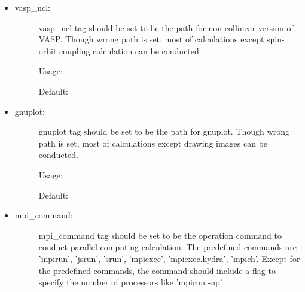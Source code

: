 \documentclass[letterpaper,10pt,english]{sphinxmanual}
\begin{document}
\begin{itemize}
\item {} \begin{description}
\item[{vasp\_ncl:}] \leavevmode
vasp\_ncl tag should be set to be the path for non-collinear version of VASP.
Though wrong path is set, most of calculations except spin-orbit coupling calculation can be conducted.

Usage:

\begin{sphinxVerbatim}[commandchars=\\\{\}]
   \PYG{p}{[}\PYG{p}{]}
\end{sphinxVerbatim}

Default:

\begin{sphinxVerbatim}[commandchars=\\\{\}]
   
\end{sphinxVerbatim}

\end{description}

\item {} \begin{description}
\item[{gnuplot:}] \leavevmode
gnuplot tag should be set to be the path for gnuplot.
Though wrong path is set, most of calculations except drawing images can be conducted.

Usage:

\begin{sphinxVerbatim}[commandchars=\\\{\}]
   \PYG{p}{[}\PYG{p}{]}
\end{sphinxVerbatim}

Default:

\begin{sphinxVerbatim}[commandchars=\\\{\}]
   
\end{sphinxVerbatim}

\end{description}

\item {} \begin{description}
\item[{mpi\_command:}] \leavevmode
mpi\_command tag should be set to be the operation command to conduct parallel computing calculation.
The predefined commands are ’mpirun’, ’jsrun’, ’srun’, ’mpiexec’, ’mpiexec.hydra’, ’mpich’.
Except for the predefined commands, the command should include a flag to specify the number of processors
like ’mpirun -np’.


\end{description}
\end{itemize}
\end{document}
